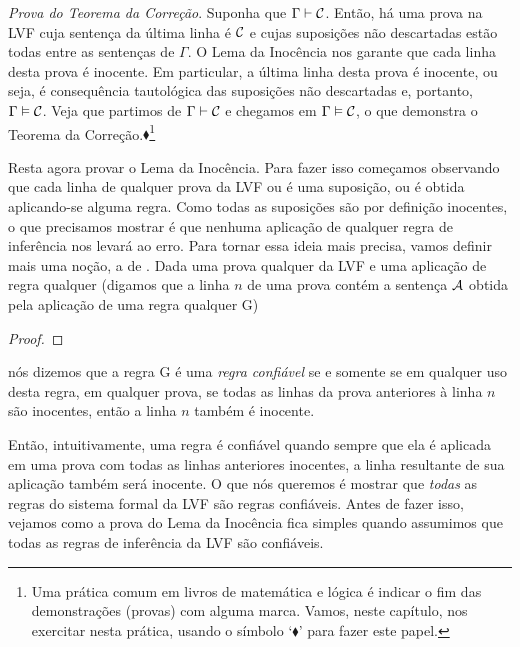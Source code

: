 \emph{Prova do Teorema da Correção}. Suponha que $\Gamma \vdash \mathcal{C}$. Então, há uma prova na LVF cuja sentença da última linha é $\mathcal{C}$ e cujas suposições não descartadas estão todas entre as sentenças de $\Gamma$.
O Lema da Inocência nos garante que cada linha desta prova é inocente.
Em particular, a última linha desta prova é inocente, ou seja, é consequência tautológica das suposições não descartadas e, portanto, $\Gamma \vDash \mathcal{C}$.
Veja que partimos de $\Gamma \vdash \mathcal{C}$ e chegamos em $\Gamma \vDash \mathcal{C}$, o que demonstra o Teorema da Correção.$\blacklozenge$\footnote{
	Uma prática comum em livros de matemática e lógica é indicar o fim das demonstrações (provas) com alguma marca. Vamos, neste capítulo, nos exercitar nesta prática, usando o símbolo `$\blacklozenge$' para fazer este papel.}

Resta agora provar o Lema da Inocência.
Para fazer isso começamos observando que cada linha de qualquer prova da LVF ou é uma suposição, ou é obtida aplicando-se alguma regra.
Como todas as suposições são por definição inocentes, o que precisamos mostrar é que nenhuma aplicação de qualquer regra de inferência nos levará ao erro.
Para tornar essa ideia mais precisa, vamos definir mais uma noção, a de .
Dada uma prova qualquer da LVF e uma aplicação de regra qualquer (digamos que a linha $n$ de uma prova contém a sentença $\mathcal{A}$ obtida pela aplicação de uma regra qualquer G)
		   \begin{proof}
		   \end{proof}	   
nós dizemos que a regra G é uma \emph{regra confiável} se e somente se em qualquer uso desta regra, em qualquer prova, se todas as linhas da prova anteriores à linha $n$ são inocentes, então a linha $n$ também é inocente.

Então, intuitivamente, uma regra é confiável quando sempre que ela é aplicada em uma prova com todas as linhas anteriores inocentes, a linha resultante de sua aplicação também será inocente.
O que nós queremos é mostrar que \emph{todas} as regras do sistema formal da LVF são regras confiáveis.
Antes de fazer isso, vejamos como a prova do Lema da Inocência fica simples quando assumimos que todas as regras de inferência da LVF são confiáveis.
	
